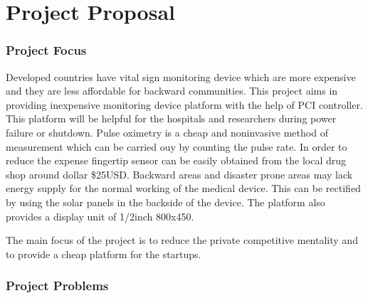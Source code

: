 
\chapter{Project Proposal}\label{chapter:firstchapter} %

\label{ChapterX} %







\subsection{Project Focus}


Developed countries have vital sign monitoring device which are more expensive and they are less affordable for backward communities.
This project aims in providing inexpensive monitoring device platform with the help of PCI controller.
This platform will be helpful for the hospitals and researchers during power failure or shutdown. 
Pulse oximetry is a cheap and noninvasive method of measurement which can be carried ouy by counting the pulse rate.
In order to reduce the expense fingertip sensor can be easily obtained from the local drug shop around dollar \$25USD.
Backward areas and disaster prone areas may lack energy supply for the normal working of the medical device.
This can be rectified by using the solar panels in the backside of the device.
The platform also provides a display unit of 1/2inch 800x450.

The main focus of the project is to reduce the private competitive mentality and to provide a cheap platform for the startups.
 


\subsection{Project Problems}

